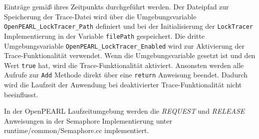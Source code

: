 Einträge gemäß ihres Zeitpunkts durchgeführt werden. Der Dateipfad zur
Speicherung der Trace-Datei wird über die Umgebungsvariable
\texttt{OpenPEARL\_LockTracer\_Path} definiert und bei der Initialisierung der
\texttt{LockTracer} Implementierung in der Variable \texttt{filePath}
gespeichert. Die dritte Umgebungsvariable
\texttt{OpenPEARL\_LockTracer\_Enabled} wird zur Aktivierung der
Trace-Funktionalität verwendet. Wenn die Umgebungsvariable gesetzt ist und den
Wert \texttt{true} hat, wird die Trace-Funktionalität aktiviert. Ansonsten
werden alle Aufrufe zur \texttt{Add} Methode direkt über eine \texttt{return}
Anweisung beendet. Dadurch wird die Laufzeit der Anwendung bei deaktivierter
Trace-Funktionalität nicht beeinflusst.

In der OpenPEARL Laufzeitumgebung werden die \textit{REQUEST} und
\textit{RELEASE} Anweisungen in der Semaphore Implementierung unter
runtime/common/Semaphore.cc implementiert.

